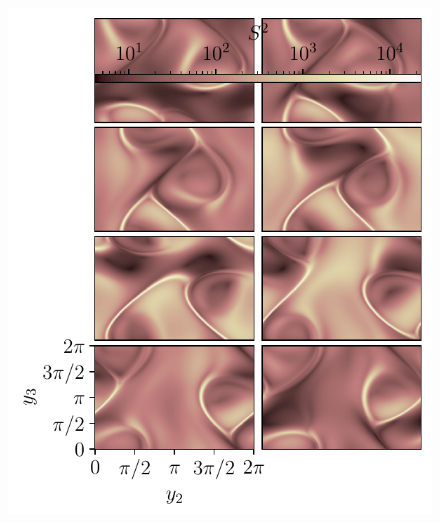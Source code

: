 \begin{landscape}
	\begin{figure}
		\centering
		\includegraphics[width=0.42\textheight]{chp04_paper_numerics/figures/gabc/S2_slices_yz}

\end{figure}
\end{landscape}
